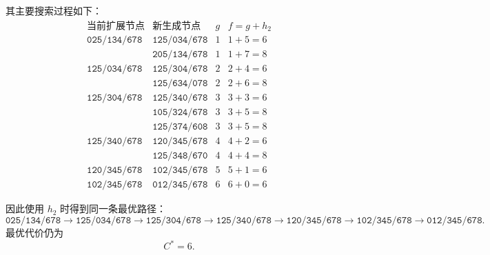 ﻿\documentclass[../main.tex]{subfiles}
\begin{document}
\begin{enumerate}[itemsep=0.3em, topsep=0.2em, leftmargin=1.5em]
{    其主要搜索过程如下：
    \[
    \begin{array}{c|c|c|c}
    \text{当前扩展节点} & \text{新生成节点} & g & f=g+h_2\\
    \hline
    \texttt{025/134/678} & \texttt{125/034/678} & 1 & 1+5=6\\
                              & \texttt{205/134/678} & 1 & 1+7=8\\
    \hline
    \texttt{125/034/678} & \texttt{125/304/678} & 2 & 2+4=6\\
                              & \texttt{125/634/078} & 2 & 2+6=8\\
    \hline
    \texttt{125/304/678} & \texttt{125/340/678} & 3 & 3+3=6\\
                              & \texttt{105/324/678} & 3 & 3+5=8\\
                              & \texttt{125/374/608} & 3 & 3+5=8\\
    \hline
    \texttt{125/340/678} & \texttt{120/345/678} & 4 & 4+2=6\\
                              & \texttt{125/348/670} & 4 & 4+4=8\\
    \hline
    \texttt{120/345/678} & \texttt{102/345/678} & 5 & 5+1=6\\
    \hline
    \texttt{102/345/678} & \texttt{012/345/678} & 6 & 6+0=6
    \end{array}
    \]

    因此使用 $h_2$ 时得到同一条最优路径：
    \[
    \texttt{025/134/678}
    \to
    \texttt{125/034/678}
    \to
    \texttt{125/304/678}
    \to
    \texttt{125/340/678}
    \to
    \texttt{120/345/678}
    \to
    \texttt{102/345/678}
    \to
    \texttt{012/345/678}.
    \]
    最优代价仍为
    \[
    C^*=6.
    \]

}
\end{enumerate}
\end{document}
